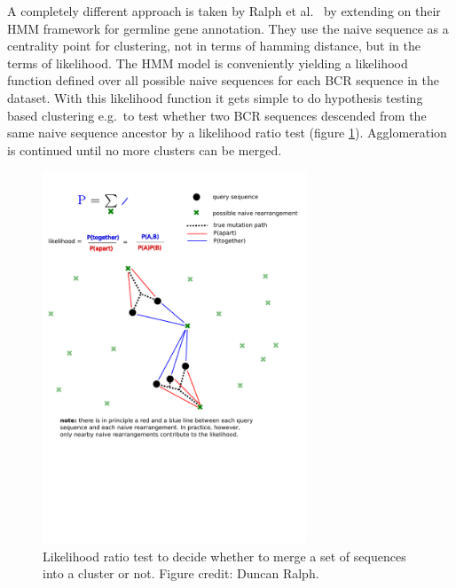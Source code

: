 A completely different approach is taken by Ralph et al.\ \cite{ralph2016likelihood} by extending on their HMM framework for germline gene annotation.
They use the naive sequence as a centrality point for clustering, not in terms of hamming distance, but in the terms of likelihood.
The HMM model is conveniently yielding a likelihood function defined over all possible naive sequences for each BCR sequence in the dataset.
With this likelihood function it gets simple to do hypothesis testing based clustering e.g.\ to test whether two BCR sequences descended from the same naive sequence ancestor by a likelihood ratio test (figure \ref{fig:partis_clustering-with-likelihood_2}).
Agglomeration is continued until no more clusters can be merged.

\begin{figure}
    \centering
    \includegraphics[width=0.7\textwidth]{figures/partis_clustering-with-likelihood_2.pdf}
    \caption{
        \label{fig:partis_clustering-with-likelihood_2}
        Likelihood ratio test to decide whether to merge a set of sequences into a cluster or not. Figure credit: Duncan Ralph.
    }
\end{figure}


